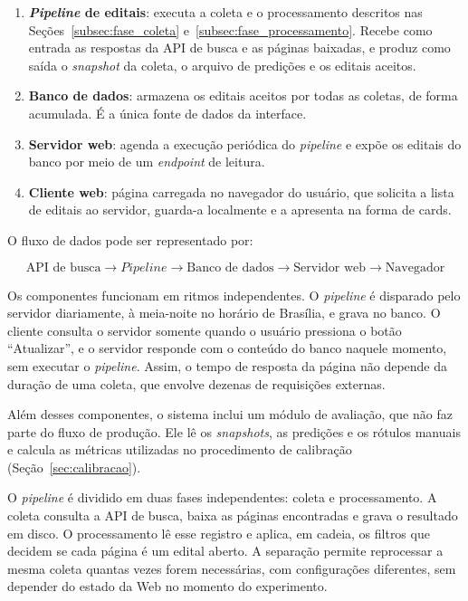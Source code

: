 \begin{enumerate}
  \item \textbf{\textit{Pipeline} de editais}: executa a coleta e o
    processamento descritos nas Seções~\ref{subsec:fase_coleta}
    e~\ref{subsec:fase_processamento}. Recebe como entrada as respostas da API
    de busca e as páginas baixadas, e produz como saída o \textit{snapshot} da
    coleta, o arquivo de predições e os editais aceitos.
  \item \textbf{Banco de dados}: armazena os editais aceitos por todas as
    coletas, de forma acumulada. É a única fonte de dados da interface.
  \item \textbf{Servidor web}: agenda a execução periódica do
    \textit{pipeline} e expõe os editais do banco por meio de um
    \textit{endpoint} de leitura.
  \item \textbf{Cliente web}: página carregada no navegador do usuário, que
    solicita a lista de editais ao servidor, guarda-a localmente e a apresenta
    na forma de cards.
\end{enumerate}

O fluxo de dados pode ser representado por:

\begin{equation*}
\text{API de busca}
\rightarrow
\textit{Pipeline}
\rightarrow
\text{Banco de dados}
\rightarrow
\text{Servidor web}
\rightarrow
\text{Navegador}
\end{equation*}

Os componentes funcionam em ritmos independentes. O \textit{pipeline} é
disparado pelo servidor diariamente, à meia-noite no horário de Brasília, e
grava no banco. O cliente consulta o
servidor somente quando o usuário pressiona o botão ``Atualizar'', e o
servidor responde com o conteúdo do banco naquele momento, sem executar o
\textit{pipeline}. Assim, o tempo de resposta da página não depende da
duração de uma coleta, que envolve dezenas de requisições externas.

Além desses componentes, o sistema inclui um módulo de avaliação, que não faz
parte do fluxo de produção. Ele lê os \textit{snapshots}, as predições e os
rótulos manuais e calcula as métricas utilizadas no procedimento de calibração
(Seção~\ref{sec:calibracao}).

O \textit{pipeline} é dividido em duas fases independentes: coleta e
processamento. A coleta consulta a API de busca, baixa as páginas encontradas e
grava o resultado em disco. O processamento lê esse registro e aplica, em
cadeia, os filtros que decidem se cada página é um edital aberto. A separação
permite reprocessar a mesma coleta quantas vezes forem necessárias, com
configurações diferentes, sem depender do estado da Web no momento do
experimento.


